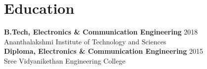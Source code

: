 \documentclass[10pt,a4paper]{article}
\begin{document}
\section{Education}
\textbf{B.Tech, Electronics \& Communication Engineering} \hfill 2018\\
Ananthalakshmi Institute of Technology and Sciences\\[3pt]
\textbf{Diploma, Electronics \& Communication Engineering} \hfill 2015\\
Sree Vidyanikethan Engineering College
\end{document}
